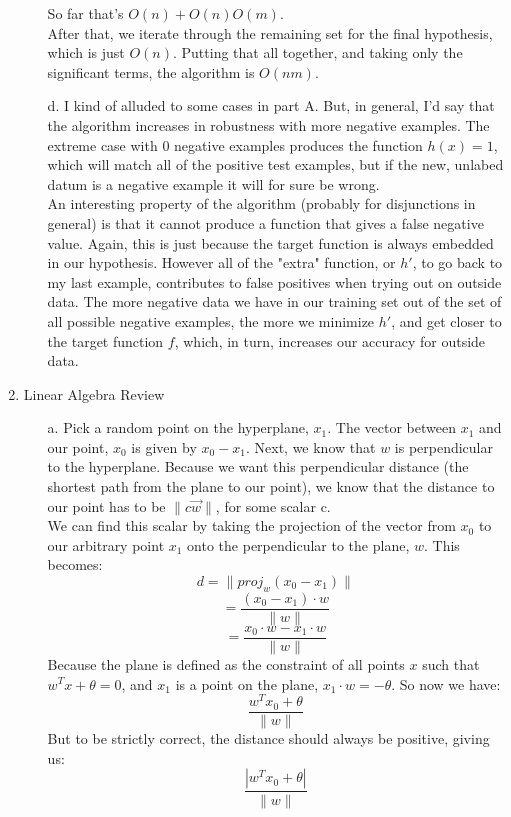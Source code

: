 \begin{enumerate}
\begin{enumerate}
			So far that's $O(n) + O(n)O(m)$.\\
			After that, we iterate through the remaining set for the final hypothesis, which is just $O(n)$.
			Putting that all together, and taking only the significant terms, the algorithm is $O(nm)$.
		\item[d.]
			I kind of alluded to some cases in part A. But, in general, I'd say that the algorithm increases in robustness with more negative 			 examples. The extreme case with 0 negative examples produces the function $h(x) = 1$, which will match all of the positive test
			examples, but if the new, unlabed datum is a negative example it will for sure be wrong.\\
			An interesting property of the algorithm (probably for disjunctions in general) is that it cannot produce a function that gives a false negative value.
			Again, this is just because the target function is always embedded in our hypothesis. However all of the "extra" function, or $h'$, to go back to my last 
			example, contributes to false positives when trying out on outside data. The more negative data we have in our training set out of the set of all possible 
			negative examples, the more we minimize $h'$, and get closer to the target function $f$, which, in turn, increases our accuracy for outside data. 
	\end{enumerate}
\item Linear Algebra Review
	\begin{enumerate}
		\item[a.]
			Pick a random point on the hyperplane, $x_1$. The vector between $x_1$ and our point, $x_0$ is given by $x_0-x_1$. Next, we know that $w$ is perpendicular to the hyperplane. Because we want this perpendicular distance (the shortest path from the plane to our point), we know that the distance to our point has to be $\| c\vec{w} \|$, for some scalar c.\\
			We can find this scalar by taking the projection of the vector from $x_0$ to our arbitrary point $x_1$ onto the perpendicular to the plane, $w$. This becomes:\\
			$$d=\|proj_{w}(x_0-x_1)\|$$
			$$=\frac{(x_0-x_1)\cdot w}{\|w\|}$$
			$$=\frac{x_0\cdot w - x_1\cdot w}{\|w\|}$$
			Because the plane is defined as the constraint of all points $x$ such that $w^Tx+\theta=0$, and $x_1$ is a point on the plane, $x_1\cdot w = -\theta$. So now we have:
			$$\frac{w^T x_0 + \theta}{\|w\|}$$
			But to be strictly correct, the distance should always be positive, giving us:
			$$\frac{|w^T x_0 + \theta|}{\|w\|}$$

\end{enumerate}
\end{enumerate}
